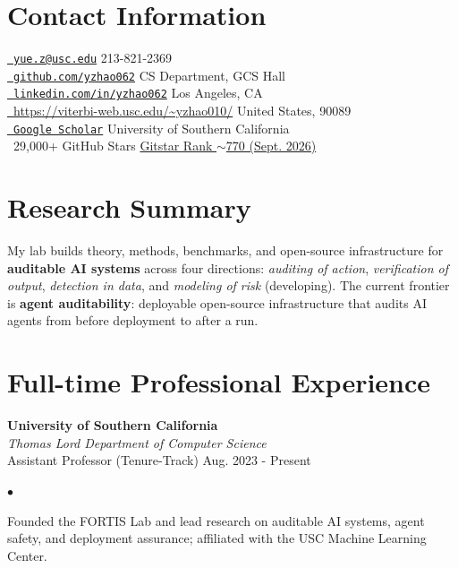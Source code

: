 \documentclass[margin,line,pifont,palatino,courier]{res}
\newenvironment{list2}{
  \begin{list}{$\bullet$}{%
      \setlength{\itemsep}{0in}
      \setlength{\parsep}{0in} \setlength{\parskip}{0in}
      \setlength{\topsep}{0in} \setlength{\partopsep}{0in}
      \setlength{\leftmargin}{0.2in}}}{\end{list}}
\begin{document}

\begin{resume}

\section{\sc Contact Information}
\href{mailto:yue.z@usc.edu}{\faEnvelope[regular]~\texttt{yue.z@usc.edu}}  \hfill 213-821-2369
\\
\href{https://github.com/yzhao062}
{\faGithub~\texttt{github.com/yzhao062}}
\hfill CS Department, GCS Hall\\
\href{https://www.linkedin.com/in/yzhao062/}{\faLinkedinIn ~\texttt{linkedin.com/in/yzhao062}}  \hfill Los Angeles, CA \\
\href{https://viterbi-web.usc.edu/~yzhao010/}{\faHome~\url{https://viterbi-web.usc.edu/~yzhao010/}}  \hfill United States, 90089 \\
\href{https://scholar.google.com/citations?user=zoGDYsoAAAAJ}{\faGoogle~\texttt{Google Scholar}}
\hfill University of Southern California\\
{\color{uscred}\faStar~29{,}000+ GitHub Stars \hfill
\href{https://gitstar-ranking.com/yzhao062}{Gitstar Rank $\sim$770 (Sept. 2026)}}
\vspace{-0.1in}

\section{\sc Research Summary}
My lab builds theory, methods, benchmarks, and open-source infrastructure for
\textbf{auditable AI systems} across four directions: \textit{auditing of action},
\textit{verification of output}, \textit{detection in data}, and \textit{modeling of risk}
(developing). The current frontier is
\textbf{agent auditability}: deployable open-source infrastructure that audits AI agents
from before deployment to after a run.
\vspace{-0.12in}

\section{\sc Full-time Professional Experience}
\textbf{University of Southern California} \\
\textit{Thomas Lord Department of Computer Science} \\
Assistant Professor (Tenure-Track) \hfill Aug. 2023 - Present
\begin{list2}
\item Founded the FORTIS Lab and lead research on auditable AI systems, agent safety, and deployment assurance; affiliated with the USC Machine Learning Center.
\end{list2}
\vspace{-0.08in}


\end{resume}
\end{document}
